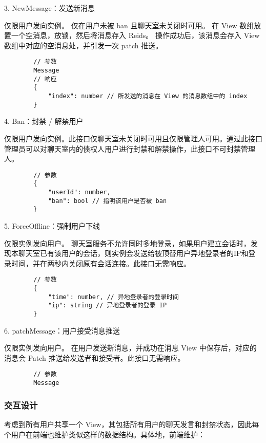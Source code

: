      3. NewMessage：发送新消息

     仅限用户发向实例。
     仅在用户未被 ban 且聊天室未关闭时可用。
     在 View 数组放置一个空消息，放锁，然后将消息存入 Reids。
     操作成功后，该消息会存入 View 数组中对应的空消息处，并引发一次 patch 推送。
  
     {\setmainfont{Courier New Bold}
     \begin{lstlisting}
        // 参数
        Message
        // 响应
        {
            "index": number // 所发送的消息在 View 的消息数组中的 index
        }
      \end{lstlisting}}

      4. Ban：封禁 / 解禁用户

      仅限用户发向实例。此接口仅聊天室未关闭时可用且仅限管理人可用。通过此接口管理员可以对聊天室内的债权人用户进行封禁和解禁操作，此接口不可封禁管理人。

      {\setmainfont{Courier New Bold}
      \begin{lstlisting}
        // 参数
        {
            "userId": number,
            "ban": bool // 指明该用户是否被 ban
        }
       \end{lstlisting}}

       5. ForceOffline：强制用户下线

       仅限实例发向用户。
       聊天室服务不允许同时多地登录，如果用户建立会话时，发现本聊天室已有该用户的会话，则实例会发送给被顶替用户异地登录者的IP和登录时间，并在两秒内关闭原有会话连接。此接口无需响应。

      {\setmainfont{Courier New Bold}
      \begin{lstlisting}
        // 参数
        {
            "time": number, // 异地登录者的登录时间
            "ip": string // 异地登录者的登录 IP
        }
       \end{lstlisting}}

       6. patchMessage：用户接受消息推送

       仅限实例发向用户。
       在用户发送新消息，并成功在消息 View 中保存后，对应的消息会 Patch 推送给发送者和接受者。此接口无需响应。
      {\setmainfont{Courier New Bold}
      \begin{lstlisting}
        // 参数
        Message
       \end{lstlisting}}

  \subsubsection{交互设计}
  考虑到所有用户共享一个 View，其包括所有用户的聊天发言和封禁状态，因此每个用户在前端也维护类似这样的数据结构。具体地，前端维护：

